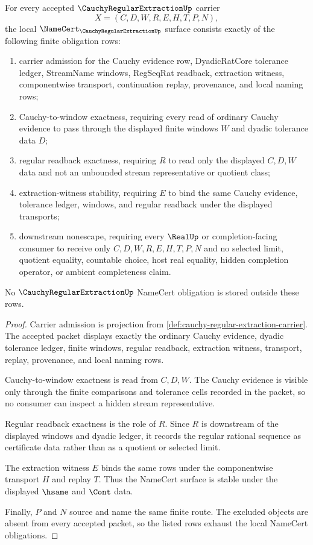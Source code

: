 \begin{theorem}
\label{thm:cauchy-regular-extraction-namecert-obligations}
For every accepted $\CauchyRegularExtractionUp$ carrier
$$
X=(C,D,W,R,E,H,T,P,N),
$$
the local $\NameCert_{\CauchyRegularExtractionUp}$ surface consists exactly of the following finite obligation rows:
\begin{enumerate}
\item carrier admission for the Cauchy evidence row, DyadicRatCore tolerance ledger, StreamName windows, RegSeqRat readback, extraction witness, componentwise transport, continuation replay, provenance, and local naming rows;
\item Cauchy-to-window exactness, requiring every read of ordinary Cauchy evidence to pass through the displayed finite windows $W$ and dyadic tolerance data $D$;
\item regular readback exactness, requiring $R$ to read only the displayed $C,D,W$ data and not an unbounded stream representative or quotient class;
\item extraction-witness stability, requiring $E$ to bind the same Cauchy evidence, tolerance ledger, windows, and regular readback under the displayed transports;
\item downstream nonescape, requiring every $\RealUp$ or completion-facing consumer to receive only $C,D,W,R,E,H,T,P,N$ and no selected limit, quotient equality, countable choice, host real equality, hidden completion operator, or ambient completeness claim.
\end{enumerate}
No $\CauchyRegularExtractionUp$ NameCert obligation is stored outside these rows.
\end{theorem}
\begin{proof}
Carrier admission is projection from \autoref{def:cauchy-regular-extraction-carrier}. The accepted packet displays exactly the ordinary Cauchy evidence, dyadic tolerance ledger, finite windows, regular readback, extraction witness, transport, replay, provenance, and local naming rows.

Cauchy-to-window exactness is read from $C,D,W$. The Cauchy evidence is visible only through the finite comparisons and tolerance cells recorded in the packet, so no consumer can inspect a hidden stream representative.

Regular readback exactness is the role of $R$. Since $R$ is downstream of the displayed windows and dyadic ledger, it records the regular rational sequence as certificate data rather than as a quotient or selected limit.

The extraction witness $E$ binds the same rows under the componentwise transport $H$ and replay $T$. Thus the NameCert surface is stable under the displayed $\hsame$ and $\Cont$ data.

Finally, $P$ and $N$ source and name the same finite route. The excluded objects are absent from every accepted packet, so the listed rows exhaust the local NameCert obligations.
\end{proof}

